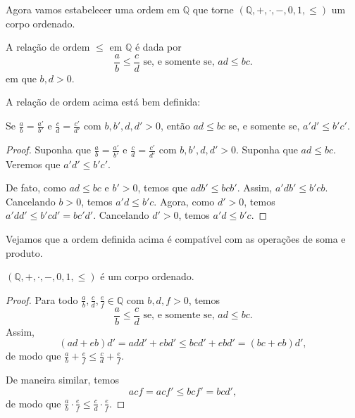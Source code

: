 Agora vamos estabelecer uma ordem em $\mathbb Q$ que torne $(\mathbb Q, +, \cdot, -, 0, 1, \leq)$ um corpo ordenado.

\begin{definition}\label{def:ordemNumerosRacionais}
A relação de ordem $\leq$ em $\mathbb Q$ é dada por
\[
    \frac{a}{b}\leq\frac{c}{d} \text{ se, e somente se, } ad\leq bc.
\]
em que $b, d>0$.
\end{definition}
A relação de ordem acima está bem definida:
\begin{lemma}
    Se $\frac{a}{b}=\frac{a'}{b'}$ e $\frac{c}{d}=\frac{c'}{d'}$ com $b, b', d, d'>0$, então $ad\leq bc$ se, e somente se, $a'd'\leq b'c'$.
\end{lemma}
\begin{proof}
    Suponha que $\frac{a}{b}=\frac{a'}{b'}$ e $\frac{c}{d}=\frac{c'}{d'}$ com $b, b', d, d'>0$.
    Suponha que $ad\leq bc$.
    Veremos que $a'd'\leq b'c'$.

    De fato, como $ad\leq bc$ e $b'>0$, temos que $adb'\leq bcb'$.
    Assim, $a'db'\leq b'cb$.
    Cancelando $b>0$, temos $a'd\leq b'c$.
    Agora, como $d'>0$, temos $a'dd'\leq b'cd'=bc'd'$.
    Cancelando $d'>0$, temos $a'd\leq b'c$.
\end{proof}

Vejamos que a ordem definida acima é compatível com as operações de soma e produto.
\begin{proposition}
    $(\mathbb Q, +, \cdot, -, 0, 1, \leq)$ é um corpo ordenado.
\end{proposition}
\begin{proof}
    Para todo $\frac{a}{b}, \frac{c}{d}, \frac{e}{f}\in\mathbb Q$ com $b, d, f>0$, temos
    \[
        \frac{a}{b}\leq\frac{c}{d} \text{ se, e somente se, } ad\leq bc.
    \]
    Assim,
    \[
        (ad+eb)d' = add' + ebd' \leq bcd' + ebd' = (bc+eb)d',
    \]
    de modo que $\frac{a}{b}+\frac{e}{f}\leq\frac{c}{d}+\frac{e}{f}$.

    De maneira similar, temos
    \[
        acf = acf' \leq bcf' = bcd',
    \]
    de modo que $\frac{a}{b}\cdot\frac{e}{f}\leq\frac{c}{d}\cdot\frac{e}{f}$.
\end{proof}

